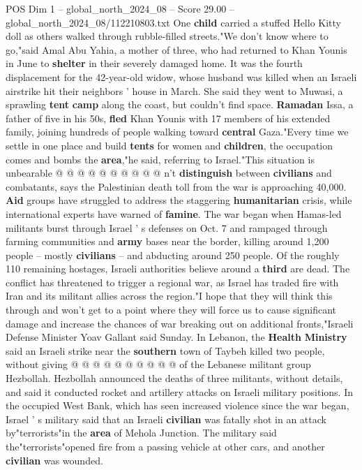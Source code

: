 \begin{textsample}{POS Dim 1 – global\_north\_2024\_08 – Score 29.00 – global\_north\_2024\_08/112210803.txt}
One \textbf{child} carried a stuffed Hello Kitty doll as others walked through rubble-filled streets."We don't know where to go,"said Amal Abu Yahia, a mother of three, who had returned to Khan Younis in June to \textbf{shelter} in their severely damaged home.
It was the fourth displacement for the 42-year-old widow, whose husband was killed when an Israeli airstrike hit their neighbors ' house in March.
She said they went to Muwasi, a sprawling \textbf{tent} \textbf{camp} along the coast, but couldn't find space. \textbf{Ramadan} Issa, a father of five in his 50s, \textbf{fled} Khan Younis with 17 members of his extended family, joining hundreds of people walking toward \textbf{central} Gaza."Every time we settle in one place and build \textbf{tents} for women and \textbf{children}, the occupation comes and bombs the \textbf{area},"he said, referring to Israel."This situation is unbearable @ @ @ @ @ @ @ @ @ @ n't \textbf{distinguish} between \textbf{civilians} and combatants, says the Palestinian death toll from the war is approaching 40,000. \textbf{Aid} groups have struggled to address the staggering \textbf{humanitarian} crisis, while international experts have warned of \textbf{famine}.
The war began when Hamas-led militants burst through Israel ' s defenses on Oct. 7 and rampaged through farming communities and \textbf{army} bases near the border, killing around 1,200 people -- mostly \textbf{civilians} -- and abducting around 250 people.
Of the roughly 110 remaining hostages, Israeli authorities believe around a \textbf{third} are dead.
The conflict has threatened to trigger a regional war, as Israel has traded fire with Iran and its militant allies across the region."I hope that they will think this through and won't get to a point where they will force us to cause significant damage and increase the chances of war breaking out on additional fronts,"Israeli Defense Minister Yoav Gallant said Sunday.
In Lebanon, the \textbf{Health} \textbf{Ministry} said an Israeli strike near the \textbf{southern} town of Taybeh killed two people, without giving @ @ @ @ @ @ @ @ @ @ of the Lebanese militant group Hezbollah.
Hezbollah announced the deaths of three militants, without details, and said it conducted rocket and artillery attacks on Israeli military positions.
In the occupied West Bank, which has seen increased violence since the war began, Israel ' s military said that an Israeli \textbf{civilian} was fatally shot in an attack by"terrorists"in the \textbf{area} of Mehola Junction.
The military said the"terrorists"opened fire from a passing vehicle at other cars, and another \textbf{civilian} was wounded.

\end{textsample}

